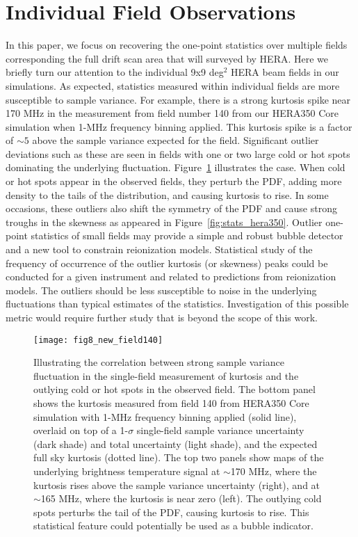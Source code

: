 \documentclass[fleqn,usenatbib]{mnras}
\begin{document}
\section{Individual Field Observations}
\label{sec:kurtosis}
In this paper, we focus on recovering the one-point statistics over multiple fields corresponding the full drift scan area that will surveyed by HERA.  Here we briefly turn our attention to the individual 9x9 deg$^2$ HERA beam fields in our simulations.  As expected, statistics measured within individual fields are more susceptible to sample variance.  For example, there is a strong kurtosis spike near 170 MHz in the measurement from field number 140 from our HERA350 Core simulation when 1-MHz frequency binning applied.  This kurtosis spike is a factor of $\sim 5$ above the sample variance expected for the field.   Significant outlier deviations such as these are seen in fields with one or two large cold or hot spots dominating the underlying fluctuation. Figure~\ref{fig:kurt_maps} illustrates the case.  When cold or hot spots appear in the observed fields, they perturb the PDF, adding more density to the tails of the distribution, and causing kurtosis to rise. In some occasions, these outliers also shift the symmetry of the PDF and cause strong troughs in the skewness as appeared in Figure~\ref{fig:stats_hera350}. Outlier one-point statistics of small fields may provide a simple and robust bubble detector and a new tool to constrain reionization models.  Statistical study of the frequency of occurrence of the outlier kurtosis (or skewness) peaks could be conducted for a given instrument and related to predictions from reionization models.  The outliers should be less susceptible to noise in the underlying fluctuations than typical estimates of the statistics.  Investigation of this possible metric would require further study that is beyond the scope of this work.

\begin{figure}
    \texttt{[image: fig8\_new\_field140]}
    \caption{Illustrating the correlation between strong sample variance fluctuation in the single-field measurement of kurtosis and the outlying cold or hot spots in the observed field. The bottom panel shows the kurtosis measured from field 140 from HERA350 Core simulation with 1-MHz frequency binning applied (solid line), overlaid on top of a 1-$\sigma$ single-field sample variance uncertainty (dark shade) and total uncertainty (light shade), and the expected full sky kurtosis (dotted line). The top two panels show maps of the underlying brightness temperature signal at $\sim$170 MHz, where the kurtosis rises above the sample variance uncertainty (right), and at $\sim$165 MHz, where the kurtosis is near zero (left). The outlying cold spots perturbs the tail of the PDF, causing kurtosis to rise. This statistical feature could potentially be used as a bubble indicator.}
    \label{fig:kurt_maps}
\end{figure}
\end{document}
